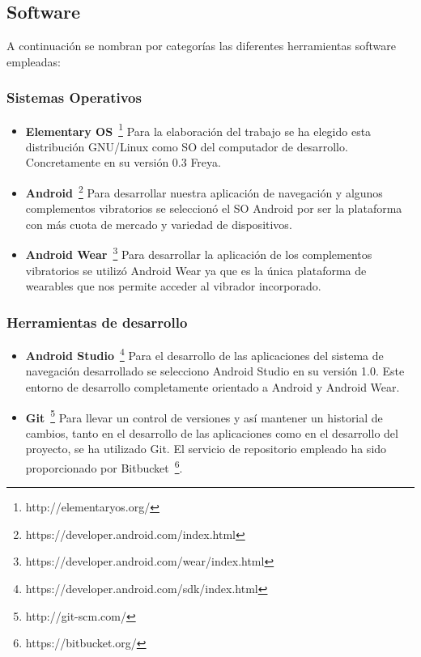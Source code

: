 \subsection{Software}
\label{sec:herramientasSoftware}

A continuación se nombran por categorías las diferentes herramientas software empleadas:

\subsubsection{Sistemas Operativos}

\begin{itemize}
  \item \textbf{Elementary OS}~\footnote{http://elementaryos.org/} Para la elaboración del trabajo
    se ha elegido esta distribución GNU/Linux como \acs{SO} del computador de
    desarrollo. Concretamente en su versión 0.3 Freya.

  \item \textbf{Android}~\footnote{https://developer.android.com/index.html} Para desarrollar
    nuestra aplicación de navegación y algunos complementos vibratorios se seleccionó el \acs{SO}
    Android por ser la plataforma con más cuota de mercado y variedad de dispositivos.

  \item \textbf{Android Wear}~\footnote{https://developer.android.com/wear/index.html} Para
    desarrollar la aplicación de los complementos vibratorios se utilizó Android Wear ya que es la
    única plataforma de wearables que nos permite acceder al vibrador incorporado.

\end{itemize}

\subsubsection{Herramientas de desarrollo}

\begin{itemize}
  \item \textbf{Android Studio}~\footnote{https://developer.android.com/sdk/index.html} Para el
    desarrollo de las aplicaciones del sistema de navegación desarrollado se selecciono Android
    Studio en su versión 1.0. Este entorno de desarrollo completamente orientado a Android y Android
    Wear.

  \item \textbf{Git}~\footnote{http://git-scm.com/} Para llevar un control de versiones y así
    mantener un historial de cambios, tanto en el desarrollo de las aplicaciones como en el
    desarrollo del proyecto, se ha utilizado Git. El servicio de repositorio empleado ha sido
    proporcionado por Bitbucket~\footnote{https://bitbucket.org/}.

\end{itemize}

